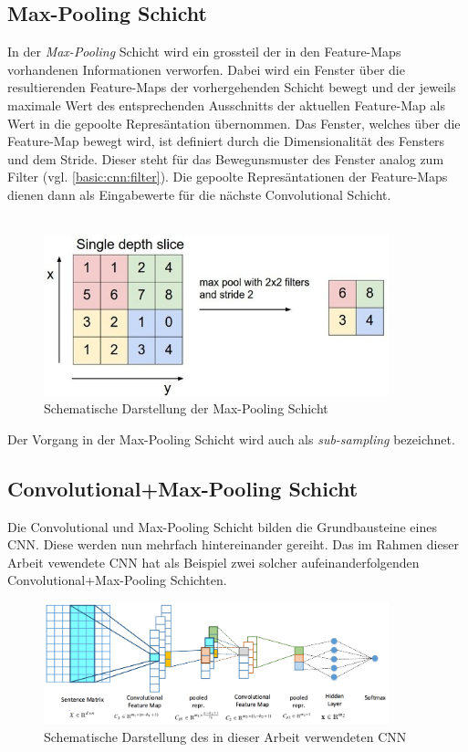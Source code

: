 \subsection{Max-Pooling Schicht}
\label{basic:cnn:pooling}
In der \emph{Max-Pooling} Schicht wird ein grossteil der in den Feature-Maps vorhandenen Informationen verworfen. Dabei wird ein Fenster über die resultierenden Feature-Maps der vorhergehenden Schicht bewegt und der jeweils maximale Wert des entsprechenden Ausschnitts der aktuellen Feature-Map als Wert in die gepoolte Represäntation übernommen. Das Fenster, welches über die Feature-Map bewegt wird, ist definiert durch die Dimensionalität des Fensters und dem Stride. Dieser steht für das Bewegunsmuster des Fenster analog zum Filter (vgl. \ref{basic:cnn:filter}). Die gepoolte Represäntationen der Feature-Maps dienen dann als Eingabewerte für die nächste Convolutional Schicht.\\\\

\begin{figure}[h]
	\centering
	\includegraphics[width=10cm]{img/max_pooling}
	\caption{Schematische Darstellung der Max-Pooling Schicht}
\end{figure}

Der Vorgang in der Max-Pooling Schicht wird auch als \emph{sub-sampling} bezeichnet.

\subsection{Convolutional+Max-Pooling Schicht}
Die Convolutional und Max-Pooling Schicht bilden die Grundbausteine eines CNN. Diese werden nun mehrfach hintereinander gereiht. Das im Rahmen dieser Arbeit vewendete CNN hat als Beispiel zwei solcher aufeinanderfolgenden Convolutional+Max-Pooling Schichten.\\

\begin{figure}[h]
	\centering
	\includegraphics[width=10cm]{img/semeval_cnn_structure}
	\caption{Schematische Darstellung des in dieser Arbeit verwendeten CNN \protect\cite{deriu2016swisscheese}}
\end{figure}

